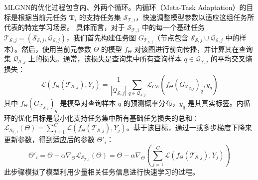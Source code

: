MLGNN的优化过程包含内、外两个循环。内循环（Meta-Task Adaptation）的目标是根据当前元任务 $\mathbf{T}_i$ 的支持任务集 $\mathcal{S}_{\mathcal{T},i}$，快速调整模型参数以适应这组任务所代表的特定学习场景。 具体而言，对于 $\mathcal{S}_{\mathcal{T},i}$ 中的每一个基础任务 $\mathcal{T}_{\mathcal{S},j} = (\mathcal{S}_{\mathcal{S},j}, \mathcal{Q}_{\mathcal{S},j})$，我们首先构建任务图 $G_{\mathcal{T}_{\mathcal{S},j}}$（节点包含 $\mathcal{S}_{\mathcal{S},j} \cup \mathcal{Q}_{\mathcal{S},j}$ 中的样本）。然后，使用当前元参数 $\Theta$ 的模型 $f_{\Theta}$ 对该图进行前向传播，并计算其在查询集 $\mathcal{Q}_{\mathcal{S},j}$ 上的损失。通常，该损失是查询集中所有查询样本 $q \in \mathcal{Q}_{\mathcal{S},j}$ 的平均交叉熵损失：
\begin{equation}
    \mathcal{L}(f_{\Theta}(\mathcal{T}_{\mathcal{S},j}), Y_j) = \frac{1}{|\mathcal{Q}_{\mathcal{S},j}|} \sum_{q \in \mathcal{Q}_{\mathcal{S},j}} \mathcal{L}_{CE}(f_{\Theta}(G_{\mathcal{T}_{\mathcal{S},j}})_q, y_q)
    \label{eq:base_task_loss}
\end{equation}
其中 $f_{\Theta}(G_{\mathcal{T}_{\mathcal{S},j}})_q$ 是模型对查询样本 $q$ 的预测概率分布，$y_q$ 是其真实标签。内循环的优化目标是最小化支持任务集中所有基础任务损失的总和：$\mathcal{L}_{\mathcal{S}_{\mathcal{T},i}}(\Theta) = \sum_{j=1}^C \mathcal{L}(f_{\Theta}(\mathcal{T}_{\mathcal{S},j}), Y_j)$。基于该目标，通过一或多步梯度下降来更新参数，得到适应后的参数 $\Theta'_i$：
\begin{equation}
    \Theta'_{i} = \Theta - \alpha \nabla_{\Theta} \mathcal{L}_{\mathcal{S}_{\mathcal{T},i}}(\Theta) = \Theta - \alpha \nabla_{\Theta} \left( \sum_{j=1}^C \mathcal{L}(f_{\Theta}(\mathcal{T}_{\mathcal{S},j}), Y_j) \right)
    \label{eq:mlgnn_inner_update_rephrased}
\end{equation}
此步骤模拟了模型利用少量相关任务信息进行快速学习的过程。

